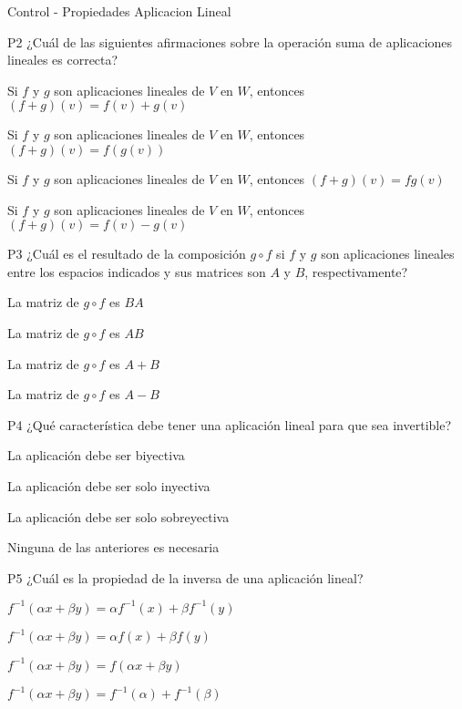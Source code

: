 \documentclass[a4,11pt]{aleph-notas}
\begin{document}
\begin{quiz}{Control - Propiedades Aplicacion Lineal}

\begin{multi}[]%
    {P2}     
    ¿Cuál de las siguientes afirmaciones sobre la operación suma de aplicaciones lineales es correcta?     
    \item* Si \( f \) y \( g \) son aplicaciones lineales de \( V \) en \( W \), entonces \( (f + g)(v) = f(v) + g(v) \)     
    \item Si \( f \) y \( g \) son aplicaciones lineales de \( V \) en \( W \), entonces \( (f + g)(v) = f(g(v)) \)     
    \item Si \( f \) y \( g \) son aplicaciones lineales de \( V \) en \( W \), entonces \( (f + g)(v) = fg(v) \)     
    \item Si \( f \) y \( g \) son aplicaciones lineales de \( V \) en \( W \), entonces \( (f + g)(v) = f(v) - g(v) \)
\end{multi}

\begin{multi}[]%
    {P3}     
    ¿Cuál es el resultado de la composición \( g \circ f \) si \( f \) y \( g \) son aplicaciones lineales entre los espacios indicados y sus matrices son \( A \) y \( B \), respectivamente?     
    \item* La matriz de \( g \circ f \) es \( BA \)     
    \item La matriz de \( g \circ f \) es \( AB \)     
    \item La matriz de \( g \circ f \) es \( A + B \)     
    \item La matriz de \( g \circ f \) es \( A - B \)
\end{multi}

\begin{multi}[]%
    {P4}     
    ¿Qué característica debe tener una aplicación lineal para que sea invertible?     
    \item* La aplicación debe ser biyectiva     
    \item La aplicación debe ser solo inyectiva     
    \item La aplicación debe ser solo sobreyectiva     
    \item Ninguna de las anteriores es necesaria
\end{multi}

\begin{multi}[]%
    {P5}     
    ¿Cuál es la propiedad de la inversa de una aplicación lineal?     
    \item* \( f^{-1}(\alpha x + \beta y) = \alpha f^{-1}(x) + \beta f^{-1}(y) \)     
    \item \( f^{-1}(\alpha x + \beta y) = \alpha f(x) + \beta f(y) \)     
    \item \( f^{-1}(\alpha x + \beta y) = f(\alpha x + \beta y) \)     
    \item \( f^{-1}(\alpha x + \beta y) = f^{-1}(\alpha) + f^{-1}(\beta) \)
\end{multi}


\end{quiz}
\end{document}
